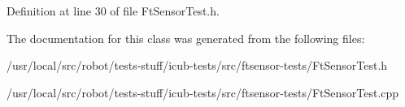Definition at line 30 of file Ft\-Sensor\-Test.\-h.



The documentation for this class was generated from the following files\-:\begin{DoxyCompactItemize}
\item 
/usr/local/src/robot/tests-\/stuff/icub-\/tests/src/ftsensor-\/tests/Ft\-Sensor\-Test.\-h\item 
/usr/local/src/robot/tests-\/stuff/icub-\/tests/src/ftsensor-\/tests/Ft\-Sensor\-Test.\-cpp\end{DoxyCompactItemize}

